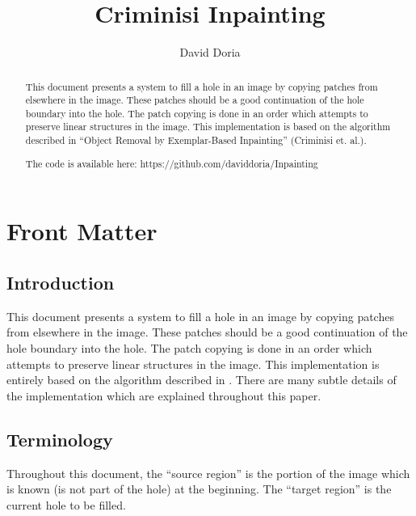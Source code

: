 \documentclass{InsightArticle}
\title{Criminisi Inpainting}
\author{David Doria}
\newcommand{\IJhandlerIDnumber}{3250}
\begin{document}
\IJhandlefooter{\IJhandlerIDnumber}


\ifpdf
\else
\fi


\maketitle


\ifhtml
\chapter*{Front Matter\label{front}}
\fi

\begin{abstract}
\noindent
This document presents a system to fill a hole in an image by copying patches from elsewhere in the image. These patches should be a good continuation of the hole boundary into the hole. The patch copying is done in an order which attempts to preserve linear structures in the image. This implementation is based on the algorithm described in ``Object Removal by Exemplar-Based Inpainting'' (Criminisi et. al.).

The code is available here:
https://github.com/daviddoria/Inpainting

\end{abstract}

\IJhandlenote{\IJhandlerIDnumber}

\tableofcontents
\section{Introduction}
This document presents a system to fill a hole in an image by copying patches from elsewhere in the image. These patches should be a good continuation of the hole boundary into the hole. The patch copying is done in an order which attempts to preserve linear structures in the image. This implementation is entirely based on the algorithm described in \cite{criminisi}. There are many subtle details of the implementation which are explained throughout this paper.

\section{Terminology}
Throughout this document, the ``source region'' is the portion of the image which is known (is not part of the hole) at the beginning. The ``target region'' is the current hole to be filled.
\end{document}
